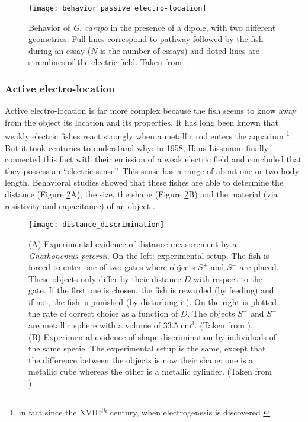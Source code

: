 %
\begin{figure}[h]
 \centering\texttt{[image: behavior\_passive\_electro-location]}

\caption{Behavior of \emph{G. carapo} in the presence of a dipole,
with two different geometries. Full lines correspond to pathway
followed by the fish during an essay ($N$ is the number of essays)
and doted lines are stremlines of the electric field. Taken
from~\cite{davis1988behavioural}.\label{fig:behavior_passive_electro-location}}

\end{figure}



\subsubsection*{Active electro-location}

Active electro-location is far more complex because the fish seems
to know away from the object its location and its properties. It
has long been known that weakly electric fishes react strongly
when a
metallic rod enters the aquarium %
\footnote{in fact since the XVIII$^{th}$ century, when electrogenesis is discovered
\cite{moller1995electric}%
}. But it took centuries to understand why: in 1958, Hans Lissmann
finally connected this fact with their emission of a weak electric
field and concluded that they possess an {}``electric sense''.
This sense has a range of about one or two body length. Behavioral
studies showed that these fishes are able to determine the
distance (Figure \ref{fig:distance_discrimination}A), the size,
the shape (Figure \ref{fig:distance_discrimination}B) and the
material (via resistivity and capacitance) of an object
\cite{von1999active,von1992electro-location,von1993electric}.

%
\begin{figure}[h]
 \centering\texttt{[image: distance\_discrimination]}

\caption{(A) Experimental evidence of distance measurement by a
\emph{Gnathonemus petersii}. On the left: experimental setup. The
fish is forced to enter one of two gates where objects $S^{+}$ and
$S^{-}$ are placed. These objects only differ by their distance
$D$ with respect to the gate. If the first one is chosen, the fish
is rewarded (by feeding) and if not, the fish is punished (by
disturbing it). On the right is plotted the rate of correct choice
as a function of $D$. The objects $S^{+}$ and $S^{-}$ are metallic
sphere with a volume of $33.5$
cm$^{3}$. (Taken from \cite{von1993electric}). \protect \\
 (B) Experimental evidence of shape discrimination by individuals
of the same specie. The experimental setup is the same, except
that the difference between the objects is now their shape: one is
a metallic cube whereas the other is a metallic cylinder. (Taken
from \cite{von2004distance}). \label{fig:distance_discrimination}}

\end{figure}


